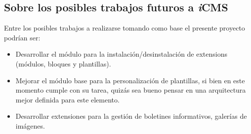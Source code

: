 \subsection{Sobre los posibles trabajos futuros a \textit{i}CMS}
Entre los posibles trabajos a realizarse tomando como base el presente proyecto podr\'ian ser:
\begin{itemize}
\item Desarrollar el m\'odulo para la instalaci\'on/desinstalaci\'on de extensions (m\'odulos, bloques y plantillas).
\item Mejorar el m\'odulo base para la personalizaci\'on de plantillas, si bien en este momento cumple con su tarea, quiz\'as sea bueno pensar en una arquitectura mejor definida para este elemento.
\item Desarrollar extensiones para la gesti\'on de boletines informativos, galer\'ias de im\'agenes.
\end{itemize}

\clearpage
